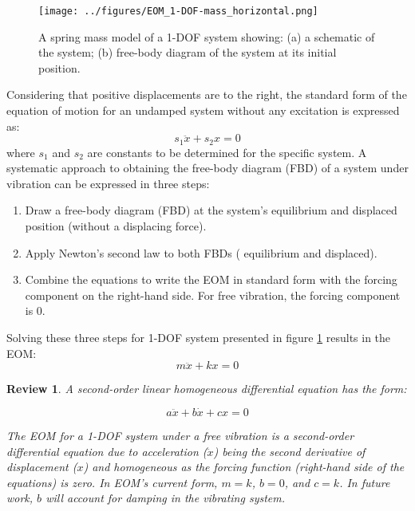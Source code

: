 \documentclass[12pt,letter]{article}
\numberwithin{ex}{section} %
\newtheorem{re}{Review}
\numberwithin{re}{section} %
\newenvironment{review}{\begin{mdframed}[middlelinewidth=2mm,roundcorner=20pt]\begin{re}\normalfont}{\end{re}\end{mdframed}}
\numberwithin{vcs}{section} %
\begin{document}
		\begin{figure}[H]
			\centering
			\texttt{[image: ../figures/EOM\_1-DOF-mass\_horizontal.png]}
			\caption{A spring mass model of a 1-DOF system showing: (a) a schematic of the system; (b)  free-body diagram of the system at its initial position.}
			\label{fig:EOM_1-DOF-mass_horizontal}
		\end{figure}			
		
		Considering that positive displacements are to the right, the standard form of the equation of motion for an undamped system without any excitation is expressed as:  
		\begin{equation}
			s_1 \ddot{x} + s_2 x = 0
		\end{equation}			
		where $s_1$ and $s_2$ are constants to be determined for the specific system. A systematic approach to obtaining the free-body diagram (FBD) of a system under vibration can be expressed in three steps:
		\begin{enumerate}
			\item Draw a free-body diagram (FBD) at the system's equilibrium and displaced position (without a displacing force).
			\item Apply Newton's second law to both FBDs ( equilibrium and displaced).
			\item Combine the equations to write the EOM in standard form with the forcing component on the right-hand side. For free vibration, the forcing component is 0. 
		\end{enumerate}
			
		Solving these three steps for 1-DOF system presented in figure \ref{fig:EOM_1-DOF-mass_horizontal} results in the EOM:
		\begin{equation}
			m \ddot{x} + k x = 0
		\end{equation}

		\begin{review}
			A second-order linear homogeneous differential equation has the form:
			
			\begin{equation}
			 a \ddot{x} + b \dot{x} + cx = 0
			\end{equation}
		
			\noindent The EOM for a 1-DOF system under a free vibration is a second-order differential equation due to acceleration ($\ddot{x}$) being the second derivative of displacement ($x$) and homogeneous as the forcing function (right-hand side of the equations) is zero. In EOM's current form, $m=k$, $b=0$,  and $c=k$. In future work, $b$ will account for damping in the vibrating system.     
		\end{review}
\end{document}
